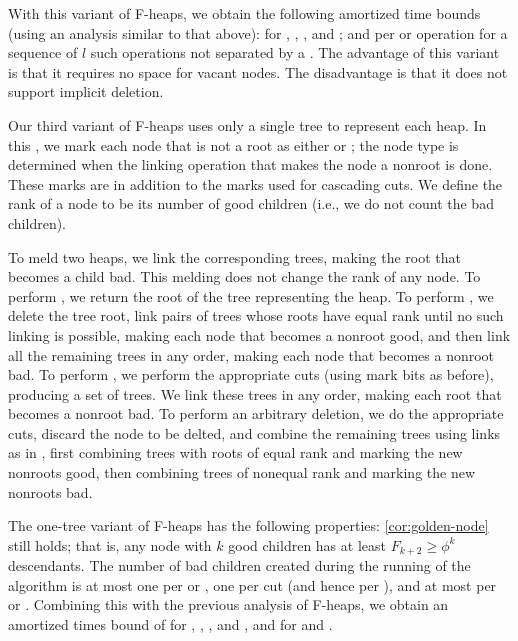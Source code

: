 With this variant of F-heaps, we obtain the following amortized time bounds (using an
analysis similar to that above):  for , ,
, and ; and  per  or
 operation for a sequence of \(l\) such operations not separated by
a . The advantage of this variant is that it requires no space for
vacant nodes. The disadvantage is that it does not support implicit deletion.

Our third variant of F-heaps uses only a single tree to represent each heap. In this
, we mark each node that is not a root as either 
or ; the node type is determined when the linking operation that makes the
node a nonroot is done. These marks are in addition to the marks used for cascading
cuts. We define the rank of a node to be its number of good children (i.e., we do not
count the bad children).

To meld two heaps, we link the corresponding trees, making the root that becomes
a child bad. This melding does not change the rank of any node. To perform
, we return the root of the tree representing the heap. To perform
, we delete the tree root, link pairs of trees whose roots have equal
rank until no such linking is possible, making each node that becomes a nonroot good,
and then link all the remaining trees in any order, making each node that becomes
a nonroot bad. To perform , we perform the appropriate cuts (using
mark bits as before), producing a set of trees. We link these trees in any order,
making each root that becomes a nonroot bad. To perform an arbitrary deletion, we do
the appropriate cuts, discard the node to be delted, and combine the remaining trees
using links as in , first combining trees with roots of equal rank
and marking the new nonroots good, then combining trees of nonequal rank and marking
the new nonroots bad.

The one-tree variant of F-heaps has the following properties:
\autoref{cor:golden-node} still holds; that is, any node with \(k\) good children has
at least \(F_{k+2} \geq \phi^k\) descendants. The number of bad children created
during the running of the algorithm is at most one per  or ,
one per cut (and hence  per ), and at most 
per  or . Combining this with the previous analysis of
F-heaps, we obtain an amortized times bound of  for ,
, , and , and  for
 and .

